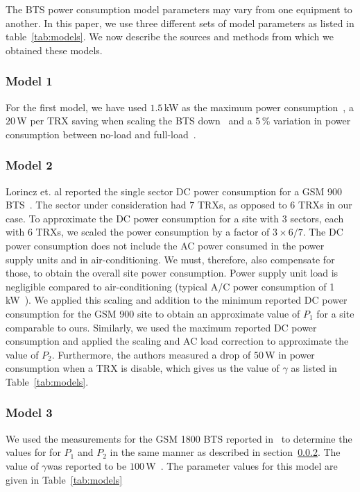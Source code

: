 The BTS power consumption model parameters may vary from one equipment to another. In this paper, we use three different sets of model parameters as listed in table~\ref{tab:models}. We now describe the sources and methods from which we obtained these models.

\subsubsection{Model 1}
\label{subsubsec:model1}For the first model, we have used $1.5$\,kW as the maximum power consumption~\cite{mbakwe:btshybribpower:2011:necec}, a $20$\,W per TRX saving when scaling the BTS down~\cite{flexibsc} and a $5$\,\% variation in power consumption between no-load and full-load~\cite{Peng:2011:BTSSaving:Mobicom}.

\subsubsection{Model 2}
\label{subsubsec:model2} Lorincz et. al reported the single sector DC power consumption for a GSM 900 BTS~\cite{Lorincz:BTS-Measure:Sensors:2012}. The sector under consideration had 7 TRXs, as opposed to 6 TRXs in our case. To approximate the DC power consumption for a site with 3 sectors, each with 6 TRXs, we scaled the power consumption by a factor of $3\times6/7$. The DC power consumption does not include the AC power consumed in the power supply units and in air-conditioning. We must, therefore, also compensate for those, to obtain the overall site power consumption. Power supply unit load is negligible compared to air-conditioning (typical A/C power consumption of 1 kW~\cite{mbakwe:btshybribpower:2011:necec}). We applied this scaling and addition to the minimum reported DC power consumption for the GSM 900 site to obtain an approximate value of $P_1$ for a site comparable to ours. Similarly, we used the maximum reported DC power consumption and applied the scaling and AC load correction to approximate the value of $P_2$. Furthermore, the authors measured a drop of $50$\,W in power consumption when a TRX is disable, which gives us the value of $\gamma$ as listed in Table~\ref{tab:models}.


\subsubsection{Model 3}
\label{subsubsec:model3}We used the measurements for the GSM 1800 BTS reported in~\cite{Lorincz:BTS-Measure:Sensors:2012} to determine the values for for $P_1$ and $P_2$ in the same manner as described in section~\ref{subsubsec:model2}. The value of $\gamma$was reported to be $100$\,W~\cite{Lorincz:BTS-Measure:Sensors:2012}. The parameter values for this model are given in Table~\ref{tab:models}

